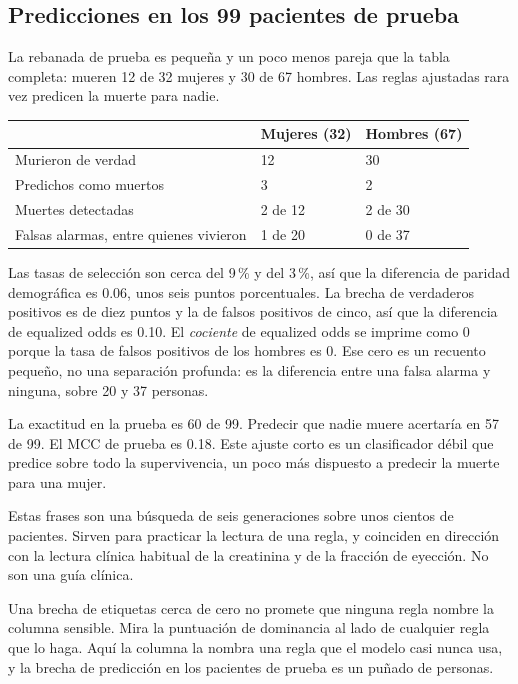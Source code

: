 \documentclass[11pt]{article}
\newcommand{\pct}[1]{\mbox{#1\,\%}}
\begin{document}
\subsection{Predicciones en los 99 pacientes de prueba}

La rebanada de prueba es pequeña y un poco menos pareja que la tabla completa: mueren 12 de 32 mujeres y 30 de 67 hombres. Las reglas ajustadas rara vez predicen la muerte para nadie.

\begin{table}[H]
\centering
\small
\begin{tabularx}{\textwidth}{@{}l Y Y@{}}
\toprule
 & Mujeres (32) & Hombres (67) \\
\midrule
Murieron de verdad & 12 & 30 \\
Predichos como muertos & 3 & 2 \\
Muertes detectadas & 2 de 12 & 2 de 30 \\
Falsas alarmas, entre quienes vivieron & 1 de 20 & 0 de 37 \\
\bottomrule
\end{tabularx}
\end{table}

Las tasas de selección son cerca del \pct{9} y del \pct{3}, así que la diferencia de paridad demográfica es 0.06, unos seis puntos porcentuales. La brecha de verdaderos positivos es de diez puntos y la de falsos positivos de cinco, así que la diferencia de equalized odds es 0.10. El \emph{cociente} de equalized odds se imprime como 0 porque la tasa de falsos positivos de los hombres es 0. Ese cero es un recuento pequeño, no una separación profunda: es la diferencia entre una falsa alarma y ninguna, sobre 20 y 37 personas.

La exactitud en la prueba es 60 de 99. Predecir que nadie muere acertaría en 57 de 99. El MCC de prueba es 0.18. Este ajuste corto es un clasificador débil que predice sobre todo la supervivencia, un poco más dispuesto a predecir la muerte para una mujer.

\begin{careful}
Estas frases son una búsqueda de seis generaciones sobre unos cientos de pacientes. Sirven para practicar la lectura de una regla, y coinciden en dirección con la lectura clínica habitual de la creatinina y de la fracción de eyección. No son una guía clínica.
\end{careful}

\begin{lesson}
Una brecha de etiquetas cerca de cero no promete que ninguna regla nombre la columna sensible. Mira la puntuación de dominancia al lado de cualquier regla que lo haga. Aquí la columna la nombra una regla que el modelo casi nunca usa, y la brecha de predicción en los pacientes de prueba es un puñado de personas.
\end{lesson}
\end{document}
